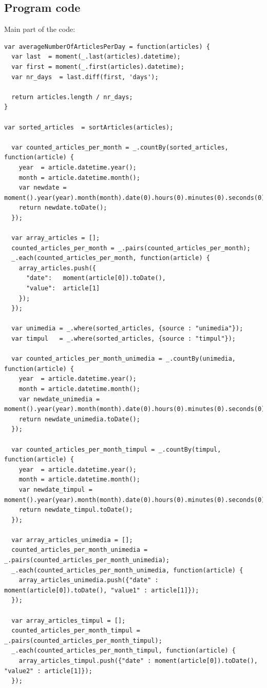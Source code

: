 \documentclass[12pt,a4paper]{article}
\begin{document}
\subsection*{Program code}
Main part of the code:\\
\begin{lstlisting}
var averageNumberOfArticlesPerDay = function(articles) {
  var last  = moment(_.last(articles).datetime);
  var first = moment(_.first(articles).datetime);
  var nr_days  = last.diff(first, 'days');

  return articles.length / nr_days;
}

var sorted_articles  = sortArticles(articles);

  var counted_articles_per_month = _.countBy(sorted_articles, function(article) {
    year  = article.datetime.year();
    month = article.datetime.month();
    var newdate = moment().year(year).month(month).date(0).hours(0).minutes(0).seconds(0);
    return newdate.toDate();
  });

  var array_articles = [];
  counted_articles_per_month = _.pairs(counted_articles_per_month);
  _.each(counted_articles_per_month, function(article) {
    array_articles.push({
      "date":   moment(article[0]).toDate(),
      "value":  article[1]
    });
  });

  var unimedia = _.where(sorted_articles, {source : "unimedia"});
  var timpul   = _.where(sorted_articles, {source : "timpul"});

  var counted_articles_per_month_unimedia = _.countBy(unimedia, function(article) {
    year  = article.datetime.year();
    month = article.datetime.month();
    var newdate_unimedia = moment().year(year).month(month).date(0).hours(0).minutes(0).seconds(0);
    return newdate_unimedia.toDate();
  });

  var counted_articles_per_month_timpul = _.countBy(timpul, function(article) {
    year  = article.datetime.year();
    month = article.datetime.month();
    var newdate_timpul = moment().year(year).month(month).date(0).hours(0).minutes(0).seconds(0);
    return newdate_timpul.toDate();
  });

  var array_articles_unimedia = [];
  counted_articles_per_month_unimedia = _.pairs(counted_articles_per_month_unimedia);
  _.each(counted_articles_per_month_unimedia, function(article) {
    array_articles_unimedia.push({"date" : moment(article[0]).toDate(), "value1" : article[1]});
  });

  var array_articles_timpul = [];
  counted_articles_per_month_timpul = _.pairs(counted_articles_per_month_timpul);
  _.each(counted_articles_per_month_timpul, function(article) {
    array_articles_timpul.push({"date" : moment(article[0]).toDate(), "value2" : article[1]});
  });

\end{lstlisting}
\end{document}
